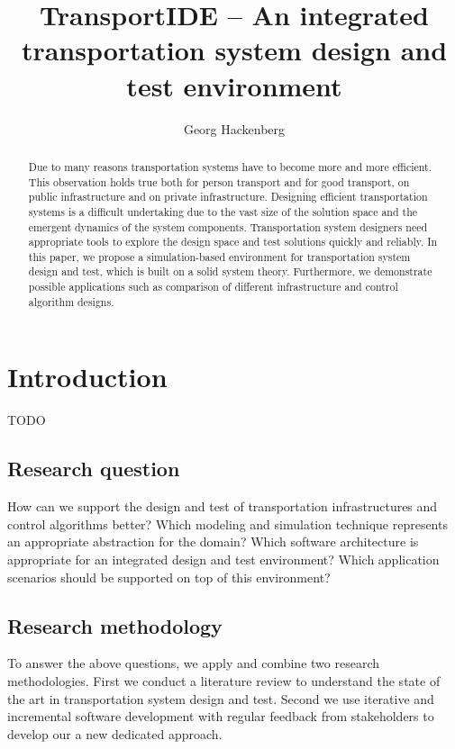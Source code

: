 \documentclass{article}
\begin{document}
    \title{\textbf{TransportIDE} -- An integrated transportation system design and test environment}
    \author{Georg Hackenberg}
    \maketitle
    
    \begin{abstract}
        Due to many reasons transportation systems have to become more and more efficient.
        This observation holds true both for person transport and for good transport, on public infrastructure and on private infrastructure.
        Designing efficient transportation systems is a difficult undertaking due to the vast size of the solution space and the emergent dynamics of the system components.
        Transportation system designers need appropriate tools to explore the design space and test solutions quickly and reliably.
        In this paper, we propose a simulation-based environment for transportation system design and test, which is built on a solid system theory.
        Furthermore, we demonstrate possible applications such as comparison of different infrastructure and control algorithm designs.
    \end{abstract}
    
    \section{Introduction}
    \label{sec:intro}
    TODO~\cite{key}

    \subsection*{Research question}
    How can we support the design and test of transportation infrastructures and control algorithms better?
    Which modeling and simulation technique represents an appropriate abstraction for the domain?
    Which software architecture is appropriate for an integrated design and test environment?
    Which application scenarios should be supported on top of this environment?

    \subsection*{Research methodology}
    To answer the above questions, we apply and combine two research methodologies.
    First we conduct a literature review to understand the state of the art in transportation system design and test.
    Second we use iterative and incremental software development with regular feedback from stakeholders to develop our a new dedicated approach.
\end{document}
